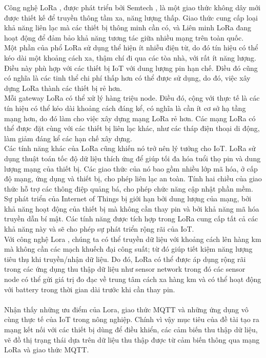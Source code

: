 \indent Công nghệ LoRa , được phát triển bởi Semtech , là một giao thức không dây mới được thiết kế để truyền thông tầm xa, năng lượng thấp. Giao thức cung cấp loại khả năng liên lạc mà các thiết bị thông minh cần có, và Liên minh LoRa đang hoạt động để đảm bảo khả năng tương tác giữa nhiều mạng trên toàn quốc.\\
\indent Một phần của phổ LoRa sử dụng thể hiện ít nhiễu điện từ, do đó tín hiệu có thể kéo dài một khoảng cách xa, thậm chí đi qua các tòa nhà, với rất ít năng lượng. Điều này phù hợp với các thiết bị IoT với dung lượng pin hạn chế. Điều đó cũng có nghĩa là các tinh thể chi phí thấp hơn có thể được sử dụng, do đó, việc xây dựng LoRa thành các thiết bị rẻ hơn.\\
\indent Mỗi gateway LoRa có thể xử lý hàng triệu node. Điều đó, cộng với thực tế là các tín hiệu có thể kéo dài khoảng cách đáng kể, có nghĩa là cần ít cơ sở hạ tầng mạng hơn, do đó làm cho việc xây dựng mạng LoRa rẻ hơn. Các mạng LoRa có thể được đặt cùng với các thiết bị liên lạc khác, như các tháp điện thoại di động, làm giảm đáng kể các hạn chế xây dựng.\\
\indent Các tính năng khác của LoRa cũng khiến nó trở nên lý tưởng cho IoT. LoRa sử dụng thuật toán tốc độ dữ liệu thích ứng để giúp tối đa hóa tuổi thọ pin và dung lượng mạng của thiết bị. Các giao thức của nó bao gồm nhiều lớp mã hóa, ở cấp độ mạng, ứng dụng và thiết bị, cho phép liên lạc an toàn. Tính hai chiều của giao thức hỗ trợ các thông điệp quảng bá, cho phép chức năng cập nhật phần mềm.\\
\indent Sự phát triển của Internet of Things bị giới hạn bởi dung lượng của mạng, bởi khả năng hoạt động của thiết bị mà không cần thay pin và bởi khả năng mã hóa truyền dẫn bí mật. Các tính năng được tích hợp trong LoRa cung cấp tất cả các khả năng này và sẽ cho phép sự phát triển rộng rãi của IoT.\\
\indent Với công nghệ Lora , chúng ta có thể truyền dữ liệu với khoảng cách lên hàng km mà không cần các mạch khuếch đại công suất; từ đó giúp tiết kiệm năng lượng tiêu thụ khi truyền/nhận dữ liệu. Do đó, LoRa có thể được áp dụng rộng rãi trong các ứng dụng thu thập dữ liệu như sensor network trong đó các sensor node có thể gửi giá trị đo đạc về trung tâm cách xa hàng km và có thể hoạt động với battery trong thời gian dài trước khi cần thay pin.\\
\\

\indent Nhận thấy những ưu điểm của Lora, giao thức MQTT và những ứng dụng vô cùng thực tế của IoT trong nông nghiệp. Chính vì vậy mục tiêu của đề tài tạo ra mạng kết nối với các thiết bị dùng để điều khiển, các cảm biến thu thập dữ liệu, vẽ đồ thị trạng thái dựa trên dữ liệu thu thập được từ cảm biến thông qua mạng LoRa và giao thức MQTT.
